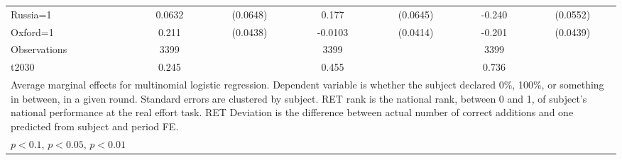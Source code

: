 \begin{tabular}{lcccccc}
Russia=1        &   0.0632         & (0.0648)&    0.177\sym{***}& (0.0645)&   -0.240\sym{***}& (0.0552)\\
Oxford=1        &    0.211\sym{***}& (0.0438)&  -0.0103         & (0.0414)&   -0.201\sym{***}& (0.0439)\\
\hline
Observations    &     3399         &         &     3399         &         &     3399         &         \\
t2030           &    0.245         &         &    0.455         &         &    0.736         &         \\
\hline\hline
\multicolumn{7}{p{12cm}}{\tiny Average marginal effects for multinomial logistic regression. Dependent variable is whether the subject declared 0\%, 100\%, or something in between, in a given round. Standard errors are clustered by subject. RET rank is the national rank, between 0 and 1, of subject's national performance at the real effort task. RET Deviation is the difference between actual number of correct additions and one predicted from subject and period FE.}\\
\multicolumn{7}{l}{\tiny \sym{*} \(p<0.1\), \sym{**} \(p<0.05\), \sym{***} \(p<0.01\)}\\
\end{tabular}